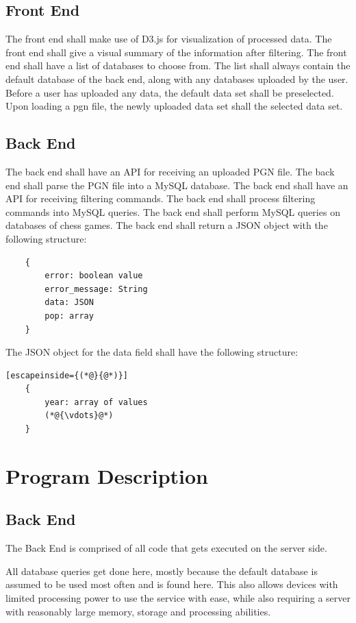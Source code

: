 \documentclass{article}
\begin{document}
\subsection{Front End}
The front end shall make use of D3.js for visualization of processed data.
The front end shall give a visual summary of the information after filtering.
The front end shall have a list of databases to choose from.  The list shall always contain the default database of the back end, along with any databases uploaded by the user.
Before a user has uploaded any data, the default data set shall be preselected.
Upon loading a pgn file, the newly uploaded data set shall the selected data set.


\subsection{Back End}
The back end shall have an API for receiving an uploaded PGN file.
The back end shall parse the PGN file into a MySQL database.
The back end shall have an API for receiving filtering commands.
The back end shall process filtering commands into MySQL queries.
The back end shall perform MySQL queries on databases of chess games.
The back end shall return a JSON object with the following structure:
\begin{lstlisting}
	{
		error: boolean value
		error_message: String
		data: JSON
		pop: array
	}
\end{lstlisting}
The JSON object for the data field shall have the following structure:
\begin{lstlisting}[escapeinside={(*@}{@*)}]
	{
		year: array of values
		(*@{\vdots}@*)
	}
\end{lstlisting}

\section{Program Description}

\subsection{Back End}
The Back End is comprised of all code that gets executed on the server side.

All database queries get done here, mostly because the default database is assumed to be used most often and is found here. This also allows devices with limited processing power to use the service with ease, while also requiring a server with reasonably large memory, storage and processing abilities.
\end{document}
